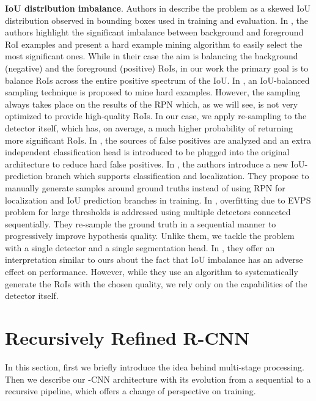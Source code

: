 \documentclass[runningheads, orivec]{llncs}
\begin{document}
\noindent\textbf{IoU distribution imbalance}.
Authors in \cite{oksuz2020imbalance} describe the problem as a skewed IoU distribution observed in bounding boxes used in training and evaluation.
In \cite{shrivastava2016training}, the authors highlight the significant imbalance between background and foreground RoI examples and present a hard example mining algorithm to easily select the most significant ones.
While in their case the aim is balancing the background (negative) and the foreground (positive) RoIs, in our work the primary goal is to balance RoIs across the entire positive spectrum of the IoU.
In \cite{pang2019libra}, an IoU-balanced sampling technique is proposed to mine hard examples.
However, the sampling always takes place on the results of the RPN which, as we will see, is not very optimized to provide high-quality RoIs.
In our case, we apply re-sampling to the detector itself, which has, on average, a much higher probability of returning more significant RoIs.
In \cite{cheng2018revisiting}, the sources of false positives are analyzed and an extra independent classification head is introduced to be plugged into the original architecture to reduce hard false positives.
In \cite{zhu2019iou}, the authors introduce a new IoU-prediction branch which supports classification and localization.
They propose to manually generate samples around ground truths instead of using RPN for localization and IoU prediction branches in training.
In \cite{Cai_2018_CVPR, chen2019hybrid}, overfitting due to EVPS problem for large thresholds is addressed using multiple detectors connected sequentially.
They re-sample the ground truth in a sequential manner to progressively improve hypothesis quality.
Unlike them, we tackle the problem with a single detector and a single segmentation head.
In \cite{oksuz2020generating}, they offer an interpretation similar to ours about the fact that IoU imbalance has an adverse effect on performance. However, while they use an algorithm to systematically generate the RoIs with the chosen quality, we rely only on the capabilities of the detector itself. 
\section{Recursively Refined R-CNN}
\label{sec:theory}

In this section, first we briefly introduce the idea behind multi-stage processing. Then we describe our -CNN architecture with its evolution from a sequential to a recursive pipeline, which offers a change of perspective on training.
\end{document}
